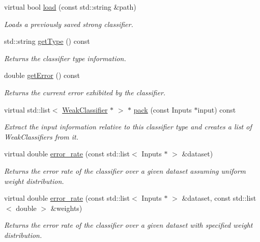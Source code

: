\begin{DoxyCompactItemize}
virtual bool \hyperlink{classiCub_1_1boostMIL_1_1StrongClassifier_a3678df5fef278e2a2e6ceabb4c82f81b}{load} (const std\+::string \&path)
\begin{DoxyCompactList}\small\item\em Loads a previously saved strong classifier. \end{DoxyCompactList}\item 
std\+::string \hyperlink{classiCub_1_1boostMIL_1_1WeakClassifier_aa5de990b0baac11f35f74493ca853ac5}{get\+Type} () const 
\begin{DoxyCompactList}\small\item\em Returns the classifier type information. \end{DoxyCompactList}\item 
double \hyperlink{classiCub_1_1boostMIL_1_1WeakClassifier_a525811a7380bcfd3cbc1edbe90e0842a}{get\+Error} () const 
\begin{DoxyCompactList}\small\item\em Returns the current error exhibited by the classifier. \end{DoxyCompactList}\item 
virtual std\+::list$<$ \hyperlink{classiCub_1_1boostMIL_1_1WeakClassifier}{Weak\+Classifier} $\ast$ $>$ $\ast$ \hyperlink{classiCub_1_1boostMIL_1_1WeakClassifier_abdf0b9bd48be536cd44939dc733097ed}{pack} (const Inputs $\ast$input) const 
\begin{DoxyCompactList}\small\item\em Extract the input information relative to this classifier type and creates a list of Weak\+Classifiers from it. \end{DoxyCompactList}\item 
virtual double \hyperlink{classiCub_1_1boostMIL_1_1WeakClassifier_a8f9de230214c99305df65010e5ddbe77}{error\+\_\+rate} (const std\+::list$<$ Inputs $\ast$ $>$ \&dataset)
\begin{DoxyCompactList}\small\item\em Returns the error rate of the classifier over a given dataset assuming uniform weight distribution. \end{DoxyCompactList}\item 
virtual double \hyperlink{classiCub_1_1boostMIL_1_1WeakClassifier_a294f03d21af03a5f96875562a5a979a0}{error\+\_\+rate} (const std\+::list$<$ Inputs $\ast$ $>$ \&dataset, const std\+::list$<$ double $>$ \&weights)
\begin{DoxyCompactList}\small\item\em Returns the error rate of the classifier over a given dataset with specified weight distribution. \end{DoxyCompactList}\end{DoxyCompactItemize}
